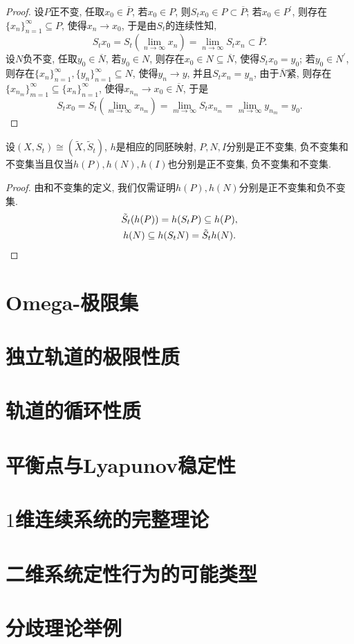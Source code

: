 \begin{proof}
	设$P$正不变, 任取$x_{0}\in \overline{P}$, 若$x_{0}\in P$, 则$S_{t}x_{0}\in P\subset \overline{P}$; 若$x_{0}\in P^{\prime}$, 则存在$\{x_{n}\}_{n=1}^{\infty}\subseteq P$, 使得$x_{n}\to x_{0}$, 于是由$S_{t}$的连续性知, $$
	S_{t}x_{0}=S_{t}\left(\lim_{n\to\infty}x_{n}\right)=\lim_{n\to\infty}S_{t}x_{n}\subset \overline{P}.$$
	设$N$负不变, 任取$y_{0}\in \overline{N}$, 若$y_{0}\in N$, 则存在$x_{0}\in N\subseteq \overline{N}$, 使得$S_{t}x_{0}=y_{0}$; 若$y_{0}\in N^{\prime}$, 则存在$\{x_{n}\}_{n=1}^{\infty},\{y_{n}\}_{n=1}^{\infty}\subseteq N$, 使得$y_{n}\to y$, 并且$S_{t}x_{n}=y_{n}$, 由于$\overline{N}$紧, 则存在$\{x_{n_{m}}\}_{m=1}^{\infty}\subseteq \{x_{n}\}_{n=1}^{\infty}$, 使得$x_{n_{m}}\to x_{0}\in \overline{N}$, 于是$$
	S_{t}x_{0}=S_{t}\left(\lim_{m\to\infty}x_{n_{m}}\right)=\lim_{m\to\infty}S_{t}x_{n_{m}}=\lim_{m\to\infty}y_{n_{m}}=y_{0}.$$
\end{proof}

\begin{exercise}
	设$(X,S_{t})\cong(\tilde{X},\tilde{S}_{t})$, $h$是相应的同胚映射, $P, N, I$分别是正不变集, 负不变集和不变集当且仅当$h(P),h(N),h(I)$也分别是正不变集, 负不变集和不变集.
\end{exercise}

\begin{proof}
	由和不变集的定义, 我们仅需证明$h(P),h(N)$分别是正不变集和负不变集.\begin{gather}
		\tilde{S}_{t}(h(P))=h(S_{t}P)\subseteq h(P),\notag\\h(N)\subseteq h(S_{t}N)=\tilde{S}_{t}h(N).\notag
	\end{gather}
\end{proof}

\section{Omega-极限集}
\section{独立轨道的极限性质}
\section{轨道的循环性质}
\section{平衡点与Lyapunov稳定性}
\section{$1$维连续系统的完整理论}
\section{二维系统定性行为的可能类型}
\section{分歧理论举例}
